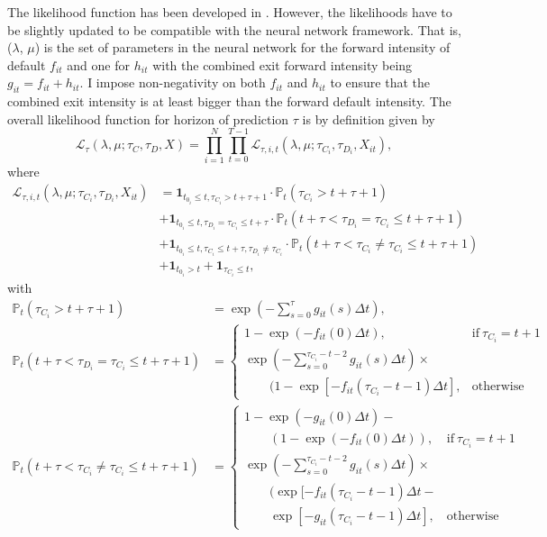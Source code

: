 The likelihood function has been developed in \citet{Duan2012}. However, the likelihoods have to be slightly updated to be compatible with the neural network framework. That is, ($\lambda$, $\mu$) is the set of parameters in the neural network for the forward intensity of default $f_{it}$ and one for $h_{it}$ with the combined exit forward intensity being $g_{it} = f_{it} + h_{it}$. I impose non-negativity on both $f_{it}$ and $h_{it}$ to ensure that the combined exit intensity is at least bigger than the forward default intensity. The overall likelihood function for horizon of prediction $\tau$ is by definition given by 
\begin{equation} \label{biglik}
\mathcal{L}_\tau(\lambda,\mu; \tau_C,\tau_D, X) = \prod_{i=1}^N \prod_{t=0}^{T-1} \mathcal{L}_{\tau,i,t}(\lambda,\mu; \tau_{C_i},\tau_{D_i}, X_{it}),
\end{equation}
where
\begin{align}
    \mathcal{L}_{\tau,i,t}(\lambda,\mu; \tau_{C_i},\tau_{D_i}, X_{it}) &= \textbf{1}_{t_{0_i} \leq t, \tau_{C_i} > t+\tau+1} \cdot \mathbb{P}_t(\tau_{C_i} > t + \tau + 1) \\ \nonumber
    &+ \textbf{1}_{t_{0_i} \leq t, \tau_{D_i}=\tau_{C_i} \leq t+\tau} \cdot \mathbb{P}_t(t+\tau < \tau_{D_i} = \tau_{C_i} \leq t + \tau + 1) \\ \nonumber
    &+ \textbf{1}_{t_{0_i} \leq t, \tau_{C_i} \leq t+\tau, \tau_{D_i} \neq \tau_{C_i}} \cdot \mathbb{P}_t(t+\tau < \tau_{C_i} \neq \tau_{C_i} \leq t+\tau + 1) \\ \nonumber
    &+ \textbf{1}_{t_{0_i}>t} + \textbf{1}_{\tau_{C_i} \leq t},
\end{align}
with
\begin{align}
    \mathbb{P}_t(\tau_{C_i} > t + \tau + 1) &= \exp(-\sum_{s=0}^{\tau}g_{it}(s)\Delta t), \\
    \mathbb{P}_t(t+\tau < \tau_{D_i} = \tau_{C_i} \leq t + \tau + 1) &=    
    \begin{cases}
      1-\exp(-f_{it}(0)\Delta t), & \text{if}\ \tau_{C_i} = t+1 \\
      \exp(-\sum\limits_{s=0}^{\tau_{C_i}-t-2}g_{it}(s)\Delta t) \times \\
          \qquad (1-\exp[-f_{it}(\tau_{C_i}-t-1)\Delta t], & \text{otherwise}
    \end{cases} \\
    \mathbb{P}_t(t+\tau < \tau_{C_i} \neq \tau_{C_i} \leq t+\tau + 1)&=
    \begin{cases}
      1-\exp(-g_{it}(0)\Delta t)- \\ 
      \qquad ( 1-\exp(-f_{it}(0)\Delta t)), & \text{if}\ \tau_{C_i} = t+1 \\
      \exp(-\sum\limits_{s=0}^{\tau_{C_i}-t-2}g_{it}(s)\Delta t) \times \\
          \qquad (\exp[-f_{it}(\tau_{C_i}-t-1)\Delta t -  \\ 
          \qquad \exp[-g_{it}(\tau_{C_i}-t-1)\Delta t], & \text{otherwise}
    \end{cases}
\end{align}


